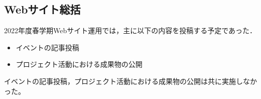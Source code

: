 \subsection*{Webサイト総括}


2022年度春学期Webサイト運用では，主に以下の内容を投稿する予定であった．

\begin{itemize}
\item イベントの記事投稿
\item プロジェクト活動における成果物の公開
\end{itemize}

イベントの記事投稿，プロジェクト活動における成果物の公開は共に実施しなかった。
